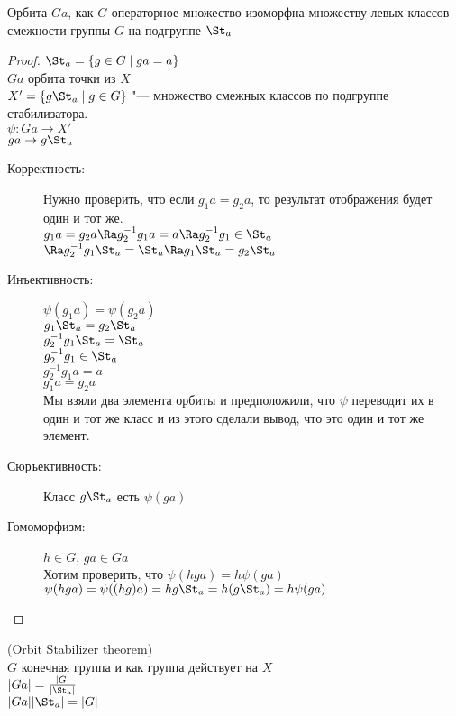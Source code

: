 \begin{theorem}
Орбита $Ga$, как $G$-операторное множество изоморфна
множеству левых классов смежности группы $G$ на подгруппе $\St_a$
\end{theorem}
\begin{proof}
$\St_a = \{g \in G \mid ga = a\}$\\
$Ga$ орбита точки из $X$\\
$X' = \{g\St_a \mid g \in G\}$ "--- множество смежных классов по подгруппе стабилизатора.\\
$\psi \colon Ga \to X'$\\
$ga \to g \St_a$\\
\begin{description}
\item[Корректность:]
Нужно проверить, что если $g_1a = g_2a$, то результат отображения будет один и тот же.\\
$g_1a  = g_2 a \Ra g_2^{-1}g_1a = a \Ra g_2^{-1}g_1 \in \St_a$\\
$\Ra g_2^{-1}g_1 \St_a = \St_a \Ra g_1 \St_a = g_2 \St_a$\\

\item[Инъективность:]
$\psi (g_1 a) = \psi (g_2a)$\\
$g_1\St_a = g_2\St_a$\\
$g_2^{-1}g_1\St_a = \St_a$\\
$g_2^{-1}g_1 \in \St_a$\\
$g_2^{-1}g_1a = a$\\
$g_1a = g_2a$\\
Мы взяли два элемента орбиты и предположили, что $\psi$ переводит их
в один и тот же класс и из этого сделали вывод, что это один и тот же элемент. 
\\
\item[Сюръективность:]
Класс $g\St_a$ есть $\psi(ga)$\\

\item[Гомоморфизм:] 
$h \in G$, $ga \in Ga$\\
Хотим проверить, что $\psi(hga) = h \psi(ga)$\\
$\psi(hga) = \psi((hg)a) = hg\St_a = h(g\St_a) = h \psi(ga)$\\
\end{description}
\end{proof}
\begin{conseq}
(Orbit Stabilizer theorem)\\
$G$ конечная группа и как группа действует на $X$\\
$|Ga| = \frac{|G|}{|\St_a|}$\\
$|Ga||\St_a| = |G|$\\
\end{conseq}
